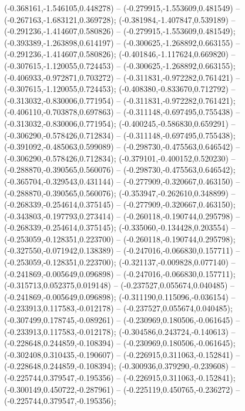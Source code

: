  (-0.368161,-1.546105,0.448278) -- (-0.279915,-1.553609,0.481549) -- (-0.267163,-1.683121,0.369728);
 (-0.381984,-1.407847,0.539189) -- (-0.291236,-1.414607,0.580826) -- (-0.279915,-1.553609,0.481549);
 (-0.393389,-1.263898,0.614197) -- (-0.300625,-1.268892,0.663155) -- (-0.291236,-1.414607,0.580826);
 (-0.401846,-1.117624,0.669820) -- (-0.307615,-1.120055,0.724453) -- (-0.300625,-1.268892,0.663155);
 (-0.406933,-0.972871,0.703272) -- (-0.311831,-0.972282,0.761421) -- (-0.307615,-1.120055,0.724453);
 (-0.408380,-0.833670,0.712792) -- (-0.313032,-0.830006,0.771954) -- (-0.311831,-0.972282,0.761421);
 (-0.406110,-0.703878,0.697863) -- (-0.311148,-0.697495,0.755438) -- (-0.313032,-0.830006,0.771954);
 (-0.400245,-0.586830,0.659291) -- (-0.306290,-0.578426,0.712834) -- (-0.311148,-0.697495,0.755438);
 (-0.391092,-0.485063,0.599089) -- (-0.298730,-0.475563,0.646542) -- (-0.306290,-0.578426,0.712834);
 (-0.379101,-0.400152,0.520230) -- (-0.288870,-0.390565,0.560076) -- (-0.298730,-0.475563,0.646542);
 (-0.365704,-0.329543,0.431144) -- (-0.277909,-0.320667,0.463150) -- (-0.288870,-0.390565,0.560076);
 (-0.353947,-0.262610,0.348899) -- (-0.268339,-0.254614,0.375145) -- (-0.277909,-0.320667,0.463150);
 (-0.343803,-0.197793,0.273414) -- (-0.260118,-0.190744,0.295798) -- (-0.268339,-0.254614,0.375145);
 (-0.335060,-0.134428,0.203554) -- (-0.253059,-0.128351,0.223700) -- (-0.260118,-0.190744,0.295798);
 (-0.327550,-0.071942,0.138389) -- (-0.247016,-0.066830,0.157711) -- (-0.253059,-0.128351,0.223700);
 (-0.321137,-0.009828,0.077140) -- (-0.241869,-0.005649,0.096898) -- (-0.247016,-0.066830,0.157711);
 (-0.315713,0.052375,0.019148) -- (-0.237527,0.055674,0.040485) -- (-0.241869,-0.005649,0.096898);
 (-0.311190,0.115096,-0.036154) -- (-0.233913,0.117583,-0.012178) -- (-0.237527,0.055674,0.040485);
 (-0.307499,0.178745,-0.089261) -- (-0.230969,0.180506,-0.061645) -- (-0.233913,0.117583,-0.012178);
 (-0.304586,0.243724,-0.140613) -- (-0.228648,0.244859,-0.108394) -- (-0.230969,0.180506,-0.061645);
 (-0.302408,0.310435,-0.190607) -- (-0.226915,0.311063,-0.152841) -- (-0.228648,0.244859,-0.108394);
 (-0.300936,0.379290,-0.239608) -- (-0.225744,0.379547,-0.195356) -- (-0.226915,0.311063,-0.152841);
 (-0.300149,0.450722,-0.287961) -- (-0.225119,0.450765,-0.236272) -- (-0.225744,0.379547,-0.195356);

